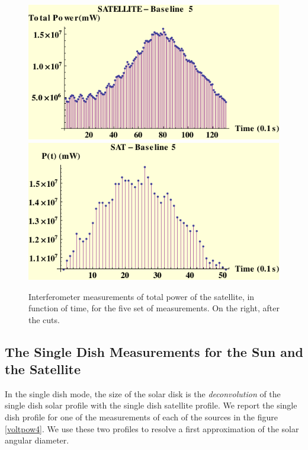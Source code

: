 \begin{figure}[htb]
\begin{center}
 \includegraphics[scale=0.7]{plots/sat5pow.pdf}
 \includegraphics[scale=0.7]{plots/sat5powc.pdf}
\caption{Interferometer measurements of total power of the satellite, in function of time, for the five set of measurements. On the right, after the  cuts.}
\label{voltpow3}
\end{center}
\end{figure}




\bigskip


\subsection{The Single Dish Measurements for the Sun and the Satellite}

In the single dish mode, the size of the solar disk is the {\it deconvolution} of the single dish solar profile with the single dish satellite profile. We report the single dish profile for one of the measurements of each of the sources in the figure \ref{voltpow4}. We use these two profiles to resolve a first approximation of the solar angular diameter.

